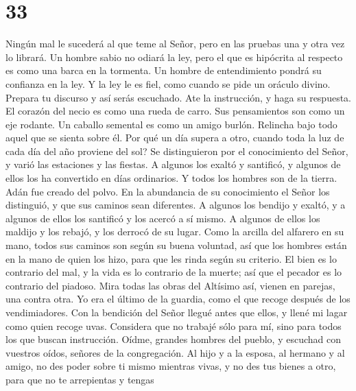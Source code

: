 \hypertarget{section-32}{%
\section{33}\label{section-32}}

 Ningún mal le sucederá al que teme al Señor, pero en las
pruebas una y otra vez lo librará.  Un hombre sabio no
odiará la ley, pero el que es hipócrita al respecto es como una barca en
la tormenta.  Un hombre de entendimiento pondrá su
confianza en la ley. Y la ley le es fiel, como cuando se pide un oráculo
divino.  Prepara tu discurso y así serás escuchado. Ate la
instrucción, y haga su respuesta.  El corazón del necio es
como una rueda de carro. Sus pensamientos son como un eje rodante.
 Un caballo semental es como un amigo burlón. Relincha
bajo todo aquel que se sienta sobre él.  Por qué un día
supera a otro, cuando toda la luz de cada día del año proviene del sol?
 Se distinguieron por el conocimiento del Señor, y varió
las estaciones y las fiestas.  A algunos los exaltó y
santificó, y algunos de ellos los ha convertido en días ordinarios.
 Y todos los hombres son de la tierra. Adán fue creado
del polvo.  En la abundancia de su conocimiento el Señor
los distinguió, y que sus caminos sean diferentes.  A
algunos los bendijo y exaltó, y a algunos de ellos los santificó y los
acercó a sí mismo. A algunos de ellos los maldijo y los rebajó, y los
derrocó de su lugar.  Como la arcilla del alfarero en su
mano, todos sus caminos son según su buena voluntad, así que los hombres
están en la mano de quien los hizo, para que les rinda según su
criterio.  El bien es lo contrario del mal, y la vida es
lo contrario de la muerte; así que el pecador es lo contrario del
piadoso.  Mira todas las obras del Altísimo así, vienen
en parejas, una contra otra.  Yo era el último de la
guardia, como el que recoge después de los vendimiadores.
 Con la bendición del Señor llegué antes que ellos, y
llené mi lagar como quien recoge uvas.  Considera que no
trabajé sólo para mí, sino para todos los que buscan instrucción.
 Oídme, grandes hombres del pueblo, y escuchad con
vuestros oídos, señores de la congregación.  Al hijo y a
la esposa, al hermano y al amigo, no des poder sobre ti mismo mientras
vivas, y no des tus bienes a otro, para que no te arrepientas y tengas
